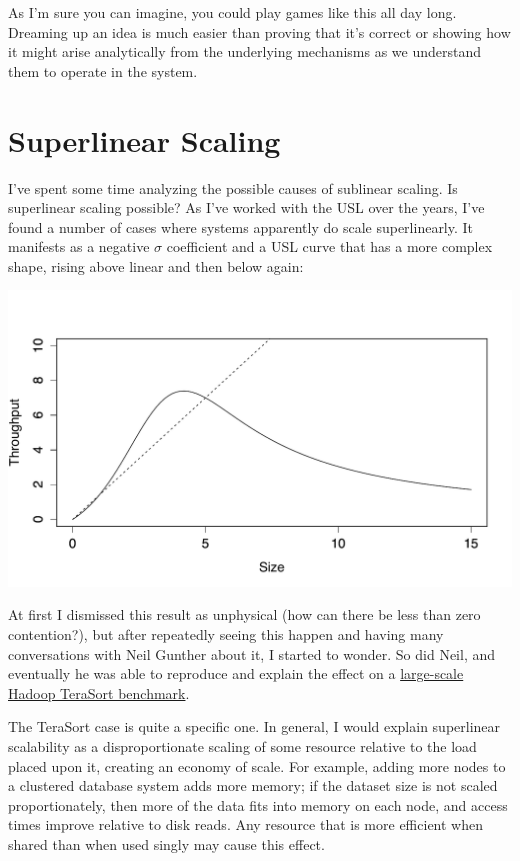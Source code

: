 \documentclass{vivid_layout}
\begin{document}
As I'm sure you can imagine, you could play games like this all day long.
Dreaming up an idea is much easier than proving that it's correct or showing
how it might arise analytically from the underlying mechanisms as we understand
them to operate in the system.

\section{Superlinear Scaling}

I've spent some time analyzing the possible causes of sublinear scaling. Is
superlinear scaling possible? As I've worked with the USL over the years, I've
found a number of cases where systems apparently do scale superlinearly. It
manifests as a negative $\sigma$ coefficient and a USL curve that has a more
complex shape, rising above linear and then below again:
\begin{center}
\includegraphics[width=.85\linewidth]{scalability/superlinear}
\end{center}

At first I dismissed this result as unphysical (how can there be less than zero
contention?), but after repeatedly seeing this happen and having many
conversations with Neil Gunther about it, I started to wonder. So did Neil, and
eventually he was able to reproduce and explain the effect on a
\href{https://queue.acm.org/detail.cfm?id=2789974}{large-scale Hadoop TeraSort
benchmark}.

The TeraSort case is quite a specific one. In general, I would explain
superlinear scalability as a disproportionate scaling of some resource relative
to the load placed upon it, creating an economy of scale. For example, adding
more nodes to a clustered database system adds more memory; if the dataset size
is not scaled proportionately, then more of the data fits into memory on each
node, and access times improve relative to disk reads. Any resource that is more
efficient when shared than when used singly may cause this effect.
\end{document}
